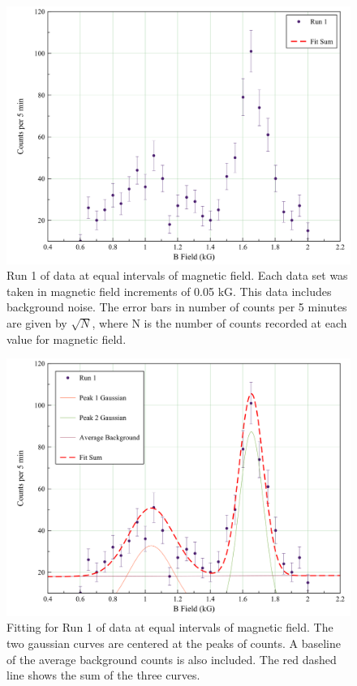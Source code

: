 \begin{figure}[H]
\begin{center}
\includegraphics[width=4 in]{run1_raw.png}
\caption{Run 1 of data at equal intervals of magnetic field. Each data set was taken in magnetic field increments of 0.05 kG. This data includes background noise. The error bars in number of counts per 5 minutes are given by $\sqrt{N}$, where N is the number of counts recorded at each value for magnetic field. }
\end{center}
\end{figure}

\begin{figure}[H]
\begin{center}
\includegraphics[width=4 in]{run1_all.png}
\caption{Fitting for Run 1 of data at equal intervals of magnetic field. The two gaussian curves are centered at the peaks of counts. A baseline of the average background counts is also included. The red dashed line shows the sum of the three curves.}
\end{center}
\end{figure}

